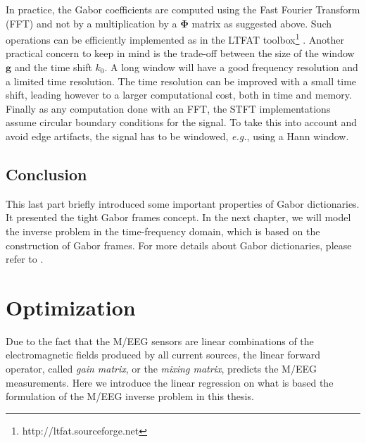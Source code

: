 In practice, the Gabor coefficients are computed using the Fast Fourier Transform (FFT) and not by a multiplication by a $\mathbf{\Phi}$ matrix as suggested above. Such operations can be efficiently implemented as in the LTFAT toolbox\footnote{http://ltfat.sourceforge.net} \cite{sondergaard2012linear}. Another practical concern to keep in mind is the trade-off between the size of the window $\mathbf{g}$ and the time shift $k_0$. A long window will have a good frequency resolution and a limited time resolution. The time resolution can be improved with a small time shift, leading however to a larger computational cost, both in time and memory. Finally as any computation done with an FFT, the STFT implementations assume circular boundary conditions for the signal. To take this into account and avoid edge artifacts, the signal has to be windowed, \textit{e.g.}, using a Hann window.

\subsection{Conclusion}

This last part briefly introduced some important properties of Gabor dictionaries. It presented the tight Gabor frames concept. In the next chapter, we will model the inverse problem in the time-frequency domain, which is based on the construction of Gabor frames. For more details about Gabor dictionaries, please refer to \cite{daubechies1992ten}.

\section{Optimization}
Due to the fact that the M/EEG sensors are linear combinations of the electromagnetic fields produced by all current sources, the linear forward operator, called \textit{gain matrix}, or the \textit{mixing matrix}, predicts the M/EEG measurements. Here we introduce the linear regression on what is based the formulation of the M/EEG inverse problem in this thesis.

